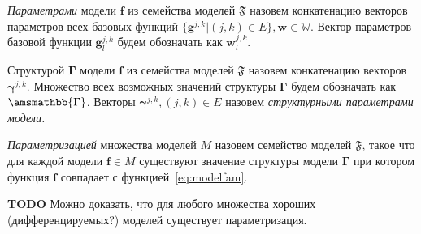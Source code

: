 \begin{defin}
\textit{Параметрами }модели $\mathbf{f}$ из семейства моделей $\mathfrak{F}$  назовем конкатенацию векторов параметров всех базовых функций $\{\mathbf{g}^{j,k}| {(j,k) \in E} \}, \mathbf{w} \in \mathbb{W}.$ Вектор параметров базовой функции $\mathbf{g}^{j,k}_l$ будем обозначать как $\mathbf{w}^{j,k}_l$.
\end{defin}



\begin{defin}
Структурой $\boldsymbol{\Gamma}$  модели $\mathbf{f}$ из семейства моделей $\mathfrak{F}$  назовем конкатенацию векторов $\boldsymbol{\gamma}^{j,k}$. Множество всех возможных значений структуры $\boldsymbol{\Gamma}$ будем обозначать как $\amsmathbb{\Gamma}$.
Векторы $\boldsymbol{\gamma}^{j,k}, (j,k) \in E$ назовем \textit{структурными параметрами модели.}
\end{defin}

\begin{defin}
\textit{Параметризацией }множества моделей $M$ назовем семейство моделей $\mathfrak{F}$, такое что для каждой модели $\mathbf{f} \in M$ существуют значение структуры модели $\boldsymbol{\Gamma}$ при котором функция $\mathbf{f}$ совпадает с функцией~\eqref{eq:modelfam}.
\end{defin}

\textbf{TODO} Можно доказать, что для любого множества хороших (дифференцируемых?) моделей существует параметризация.

